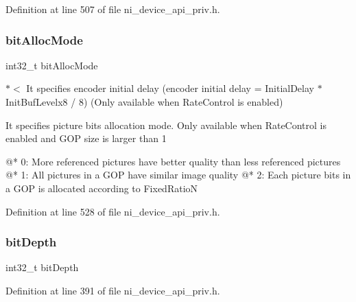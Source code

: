 Definition at line 507 of file ni\+\_\+device\+\_\+api\+\_\+priv.\+h.

\mbox{\label{struct__ni__encoder__change__params__t_a6346a66e3a3e2a1b68f8c6fd8e9e4ef3}} 
\subsubsection{\texorpdfstring{bitAllocMode}{bitAllocMode}}
{\footnotesize\ttfamily int32\+\_\+t bit\+Alloc\+Mode}

$\ast$$<$ It specifies encoder initial delay (encoder initial delay = Initial\+Delay $\ast$ Init\+Buf\+Levelx8 / 8) (Only available when Rate\+Control is enabled)


\begin{DoxyItemize}
\item \begin{DoxyVerb}It specifies picture bits allocation mode.
Only available when RateControl is enabled and GOP size is larger than 1

@* 0: More referenced pictures have better quality than less referenced pictures
@* 1: All pictures in a GOP have similar image quality
@* 2: Each picture bits in a GOP is allocated according to FixedRatioN
\end{DoxyVerb}
 
\end{DoxyItemize}

Definition at line 528 of file ni\+\_\+device\+\_\+api\+\_\+priv.\+h.

\mbox{\label{struct__ni__encoder__change__params__t_a990931498b038c9b044314f5d28c118f}} 
\subsubsection{\texorpdfstring{bitDepth}{bitDepth}}
{\footnotesize\ttfamily int32\+\_\+t bit\+Depth}



Definition at line 391 of file ni\+\_\+device\+\_\+api\+\_\+priv.\+h.

